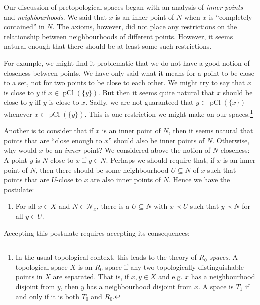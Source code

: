 \documentclass[article, a4paper, 11pt, oneside]{memoir}
\numberwithin{equation}{chapter}
\newcommand{\calU}{\mathcal{U}}
\newcommand{\inpoint}{\prec}
\newcommand{\calN}{\mathcal{N}}
\newcommand{\nhoods}[1]{\calN_{#1}}
\newcommand{\pCl}[1]{\operatorname{pCl}(#1)}
\begin{document}
Our discussion of pretopological spaces began with an analysis of \emph{inner points} and \emph{neighbourhoods}. We said that $x$ is an inner point of $N$ when $x$ is \enquote{completely contained} in $N$. The axioms, however, did not place any restrictions on the relationship between neighbourhoods of different points. However, it seems natural enough that there should be at least some such restrictions.

For example, we might find it problematic that we do not have a good notion of closeness between points. We have only said what it means for a point to be close to a set, not for two points to be close to each other. We might try to say that $x$ is close to $y$ if $x \in \pCl{\{y\}}$. But then it seems quite natural that $x$ should be close to $y$ iff $y$ is close to $x$. Sadly, we are not guaranteed that $y \in \pCl{\{x\}}$ whenever $x \in \pCl{\{y\}}$. This is one restriction we might make on our spaces.\footnote{In the usual topological context, this leads to the theory of \emph{$R_0$-spaces}. A topological space $X$ is an $R_0$-space if any two topologically distinguishable points in $X$ are separated. That is, if $x,y \in X$ and e.g. $x$ has a neighbourhood disjoint from $y$, then $y$ has a neighbourhood disjoint from $x$. A space is $T_1$ if and only if it is both $T_0$ and $R_0$.}

Another is to consider that if $x$ is an inner point of $N$, then it seems natural that points that are \enquote{close enough to $x$} should also be inner points of $N$. Otherwise, why would $x$ be an \emph{inner} point? We considered above the notion of $N$-closeness: A point $y$ is $N$-close to $x$ if $y \in N$. Perhaps we should require that, if $x$ is an inner point of $N$, then there should be some neighbourhood $U \subseteq N$ of $x$ such that points that are $U$-close to $x$ are also inner points of $N$. Hence we have the postulate:
%
\begin{enumerate}[resume*=axioms]
    \item For all $x \in X$ and $N \in \nhoods{x}$, there is a $U \subseteq N$ with $x \inpoint U$ such that $y \inpoint N$ for all $y \in U$.
\end{enumerate}
%
Accepting this postulate requires accepting its consequences:

\newcommand{\opens}[1]{\calU_{#1}}
\end{document}
